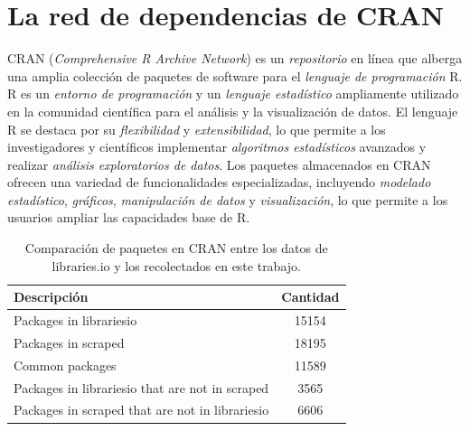 

\section{La red de dependencias de CRAN}

CRAN (\textit{Comprehensive R Archive Network}) es un \textit{repositorio} en línea que alberga
una amplia colección de paquetes de software para el \textit{lenguaje de programación} R.
R es un \textit{entorno de programación} y un \textit{lenguaje estadístico} ampliamente
utilizado en la comunidad científica para el análisis y la visualización de datos.
El lenguaje R se destaca por su \textit{flexibilidad} y \textit{extensibilidad},
lo que permite a los investigadores y científicos implementar \textit{algoritmos estadísticos}
avanzados y realizar \textit{análisis exploratorios de datos}.
Los paquetes almacenados en CRAN ofrecen una variedad de funcionalidades especializadas,
incluyendo \textit{modelado estadístico}, \textit{gráficos}, \textit{manipulación de datos}
y \textit{visualización}, lo que permite a los usuarios ampliar las capacidades base de R.

\begin{table}[h!]
    \begin{center}
        \begin{tabular}{|l|c|}
            \hline
            \textbf{Descripción}                            & \textbf{Cantidad} \\
            \hline
            Packages in librariesio                         & 15154             \\
            Packages in scraped                             & 18195             \\
            Common packages                                 & 11589             \\
            Packages in librariesio that are not in scraped & 3565              \\
            Packages in scraped that are not in librariesio & 6606              \\
            \hline
        \end{tabular}
        \caption{Comparación de paquetes en CRAN entre los datos de libraries.io y los recolectados en este trabajo.}
        \label{tab:cran_common_packages}
    \end{center}
\end{table}

